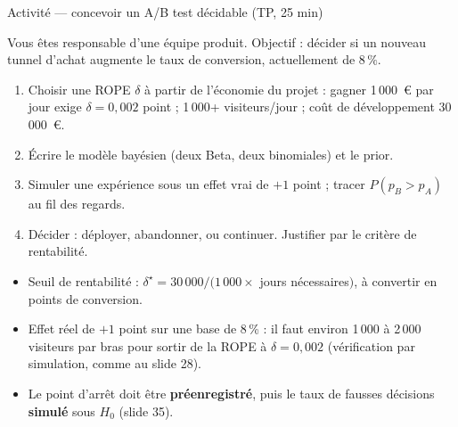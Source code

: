 \begin{frame}{Activité --- concevoir un A/B test décidable (TP, 25 min)}
\small
\begin{abox}[Consigne]
Vous êtes responsable d'une équipe produit. Objectif : décider si un
nouveau tunnel d'achat augmente le taux de conversion, actuellement de
$8\,\%$.
\begin{enumerate}
  \item Choisir une ROPE $\delta$ à partir de l'économie du projet :
        gagner 1\,000~€ par jour exige $\delta = 0{,}002$ point ;
        1\,000+ visiteurs/jour ; coût de développement 30\,000~€.
  \item Écrire le modèle bayésien (deux Beta, deux binomiales) et le prior.
  \item Simuler une expérience sous un effet vrai de $+1$ point ;
        tracer $P(p_B > p_A)$ au fil des regards.
  \item Décider : déployer, abandonner, ou continuer. Justifier par
        le critère de rentabilité.
\end{enumerate}
\end{abox}
\vspace{1mm}
\begin{solbox}
\begin{itemize}
  \item Seuil de rentabilité : $\delta^\star = 30\,000/(1\,000 \times$ jours
        nécessaires$)$, à convertir en points de conversion.
  \item Effet réel de $+1$ point sur une base de 8\,\% : il faut environ
        1\,000 à 2\,000 visiteurs par bras pour sortir de la ROPE à
        $\delta = 0{,}002$ (vérification par simulation, comme au slide 28).
  \item Le point d'arrêt doit être \textbf{préenregistré}, puis le taux de
        fausses décisions \textbf{simulé} sous $H_0$ (slide 35).
\end{itemize}
\end{solbox}
\end{frame}


